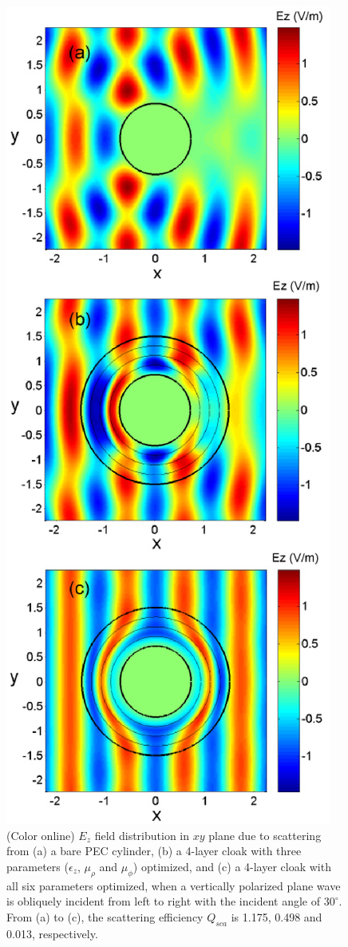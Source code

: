 \documentclass[12pt]{article} %
\begin{document}
\begin{figure}
\centering
\includegraphics[width=0.5\columnwidth,draft=false]{Fig_2}%
\caption{\label{fig:total} (Color online) $E_z$ field distribution
in $xy$ plane due to scattering from (a) a bare PEC cylinder, (b) a
4-layer cloak with three parameters ($\epsilon_z$, $\mu_\rho$ and
$\mu_\phi$) optimized, and (c) a 4-layer cloak with all six
parameters optimized, when a vertically polarized plane wave is
obliquely incident from left to right with the incident angle of
$30^{\circ}$. From (a) to (c), the scattering efficiency $Q_{sca}$
is 1.175, 0.498 and 0.013, respectively.}
\end{figure}
\end{document}
